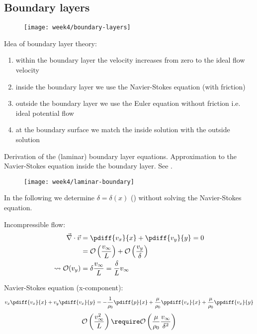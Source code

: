 \newpage
\subsection{Boundary layers}

\begin{figure}[ht]
    \centering
    \texttt{[image: week4/boundary-layers]}\\
    \caption{}
    \label{fig:boundary-layers}
\end{figure}

Idea of boundary layer theory:
\begin{enumerate}
\item within the boundary layer the velocity increases from zero to the ideal flow velocity
\item inside the boundary layer we use the Navier-Stokes equation (with friction)
\item outside the boundary layer we use the Euler equation without friction i.e. ideal potential flow
\item at the boundary surface we match the inside solution with the outside solution
\end{enumerate}

Derivation of the (laminar) boundary layer equations. Approximation to the Navier-Stokes equation inside the boundary layer. See .

\begin{figure}[ht]
    \centering
    \texttt{[image: week4/laminar-boundary]}\\
    \caption{}
    \label{fig:laminar-boundary}
\end{figure}

In the following we determine $\delta = \delta(x)$ () without solving the Navier-Stokes equation.

Incompressible flow:
\begin{align}
\vec{\nabla}\cdot\vec{v} &= \pdiff{v_x}{x} + \pdiff{v_y}{y} = 0 \\
&= \mathcal{O} \left(\frac{v_\infty}{L}\right) + \mathcal{O} \left(\frac{v_y}{\delta}\right) \\
\leadsto
\mathcal{O}(v_y) &= \delta\frac{v_\infty}{L} = \frac{\delta}{L}v_\infty
\end{align}

Navier-Stokes equation (x-component):
\begin{equation}
v_x\pdiff{v_x}{x} + v_y\pdiff{v_x}{y} = -\frac{1}{\rho_0}\pdiff{p}{x} + \frac{\mu}{\rho_0}\ppdiff{v_x}{x} + \frac{\mu}{\rho_0}\ppdiff{v_x}{y}
\end{equation}
\begin{equation}
\mathcal{O} \left(\frac{v_\infty^2}{L}\right) \require \mathcal{O} \left(\frac{\mu}{\rho_0}\frac{v_\infty}{\delta^2}\right)
\end{equation}

